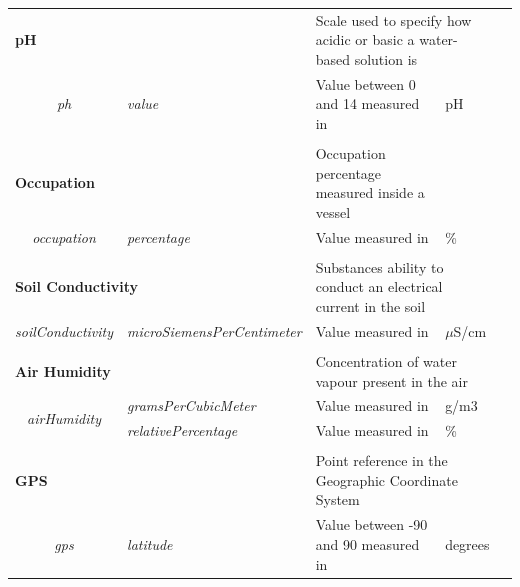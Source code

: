 \begin{landscape}
\begin{longtable}{cllll}
   \\[-0.85em]
   \multicolumn{2}{l}{\textbf{pH}}                                            & \multicolumn{2}{l}{Scale used to specify how acidic or basic a water-based solution is} &  \\
   \textit{ph}                           & \textit{value}                     & Value between 0 and 14 measured in                     & pH                             &  \\ [0.4em] \cline{1-4}
   \\[-0.85em]
   \multicolumn{2}{l}{\textbf{Occupation}}                                    & Occupation percentage measured inside a vessel         &                                &  \\
   \textit{occupation}                   & \textit{percentage}                & Value measured in                                      & \%                             &  \\ [0.4em] \cline{1-4}
   \\[-0.85em]
   \multicolumn{2}{l}{\textbf{Soil Conductivity}}                             & \multicolumn{2}{l}{Substances ability to conduct an electrical current in the soil}     &  \\
   \textit{soilConductivity}             & \textit{microSiemensPerCentimeter} & Value measured in                                      & $\mu$S/cm                      &  \\ [0.4em] \cline{1-4}
   \\[-0.85em]
   \multicolumn{2}{l}{\textbf{Air Humidity}}                                  & \multicolumn{2}{l}{Concentration of water vapour present in the air}                    &  \\
   \multirow{2}{*}{\textit{airHumidity}} & \textit{gramsPerCubicMeter}        & Value measured in                                      & g/m3                           &  \\
                                         & \textit{relativePercentage}        & Value measured in                                      & \%                             &  \\ [0.4em] \cline{1-4}
   \\[-0.85em]
   \multicolumn{2}{l}{\textbf{GPS}}                                           & \multicolumn{2}{l}{Point reference in the Geographic Coordinate System}                 &  \\
   \multirow{3}{*}{\textit{gps}}         & \textit{latitude}                  & Value between -90 and 90 measured in                   & degrees                        &  \\

\end{longtable}
\end{landscape}
